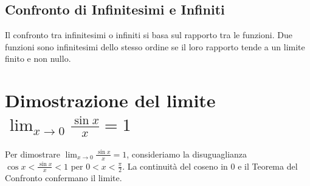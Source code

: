 \documentclass{book}
\begin{document}
\subsection*{Confronto di Infinitesimi e Infiniti}
Il confronto tra infinitesimi o infiniti si basa sul rapporto tra le funzioni. Due funzioni sono infinitesimi dello stesso ordine se il loro rapporto tende a un limite finito e non nullo.

\section*{Dimostrazione del limite \( \lim_{x \to 0}\frac{\sin x}{x} = 1 \)}
Per dimostrare \( \lim_{x \to 0}\frac{\sin x}{x} = 1 \), consideriamo la disuguaglianza \( \cos x < \frac{\sin x}{x} < 1 \) per \( 0 < x < \frac{\pi}{2} \). La continuità del coseno in \( 0 \) e il Teorema del Confronto confermano il limite.
\end{document}
